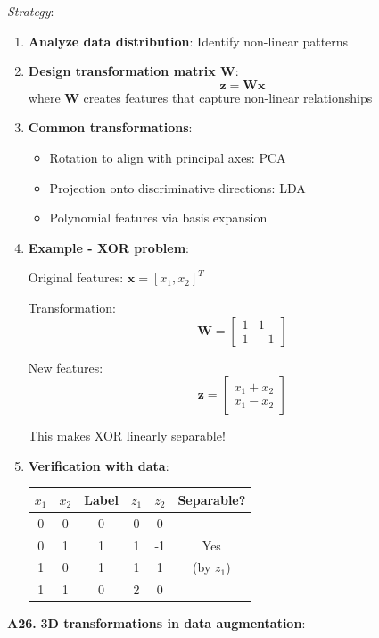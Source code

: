 \documentclass[12pt,a4paper]{article}
\theoremstyle{definition}
\begin{document}
\textit{Strategy}:
\begin{enumerate}
\item \textbf{Analyze data distribution}: Identify non-linear patterns
\item \textbf{Design transformation matrix $\mathbf{W}$}:
\[
\mathbf{z} = \mathbf{W}\mathbf{x}
\]
where $\mathbf{W}$ creates features that capture non-linear relationships

\item \textbf{Common transformations}:
\begin{itemize}
\item Rotation to align with principal axes: PCA
\item Projection onto discriminative directions: LDA
\item Polynomial features via basis expansion
\end{itemize}

\item \textbf{Example - XOR problem}:

Original features: $\mathbf{x} = [x_1, x_2]^T$

Transformation:
\[
\mathbf{W} = \begin{bmatrix}
1 & 1 \\
1 & -1
\end{bmatrix}
\]

New features:
\[
\mathbf{z} = \begin{bmatrix}
x_1 + x_2 \\
x_1 - x_2
\end{bmatrix}
\]

This makes XOR linearly separable!

\item \textbf{Verification with data}:

\begin{center}
\begin{tabular}{ccc|cc|c}
$x_1$ & $x_2$ & Label & $z_1$ & $z_2$ & Separable? \\
\hline
0 & 0 & 0 & 0 & 0 & \\
0 & 1 & 1 & 1 & -1 & Yes \\
1 & 0 & 1 & 1 & 1 & (by $z_1$) \\
1 & 1 & 0 & 2 & 0 & \\
\end{tabular}
\end{center}
\end{enumerate}

\textbf{A26.} \textbf{3D transformations in data augmentation}:
\end{document}
